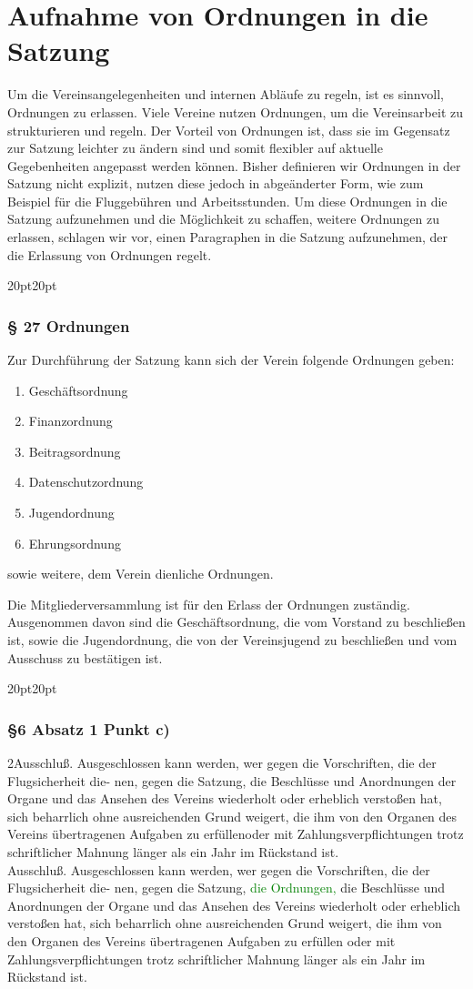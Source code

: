 \documentclass[10pt,a4paper,parskip=half]{scrartcl}
\newcommand{\new}[1]{\textcolor{Green}{#1}}
\newcommand{\change}[1]{
  \begin{adjustwidth}{20pt}{20pt}
    #1
  \end{adjustwidth}
}
\newcommand{\compare}[3]{\change{\subsubsection*{#1}\begin{multicols}{2}#2\columnbreak\\#3\end{multicols}}}
\begin{document}
  \section{Aufnahme von Ordnungen in die Satzung}
  \label{sec:ordnungen}
  Um die Vereinsangelegenheiten und internen Abläufe zu regeln, ist es sinnvoll, Ordnungen zu erlassen. Viele Vereine nutzen Ordnungen, um die Vereinsarbeit zu strukturieren und regeln. Der Vorteil von Ordnungen ist, dass sie im Gegensatz zur Satzung leichter zu ändern sind und somit flexibler auf aktuelle Gegebenheiten angepasst werden können. Bisher definieren wir Ordnungen in der Satzung nicht explizit, nutzen diese jedoch in abgeänderter Form, wie zum Beispiel für die Fluggebühren und Arbeitsstunden. Um diese Ordnungen in die Satzung aufzunehmen und die Möglichkeit zu schaffen, weitere Ordnungen zu erlassen, schlagen wir vor, einen Paragraphen in die Satzung aufzunehmen, der die Erlassung von Ordnungen regelt.

  \change{
    \subsubsection*{§ 27 Ordnungen}
    Zur Durchführung der Satzung kann sich der Verein folgende Ordnungen geben:
    \begin{enumerate}[label=\alph*),noitemsep]
      \item Geschäftsordnung
      \item Finanzordnung
      \item Beitragsordnung
      \item Datenschutzordnung
      \item Jugendordnung
      \item Ehrungsordnung
    \end{enumerate}
    sowie weitere, dem Verein dienliche Ordnungen.
    
    Die Mitgliederversammlung ist für den Erlass der Ordnungen zuständig.
    Ausgenommen davon sind die Geschäftsordnung,
    die vom Vorstand zu beschließen ist,
    sowie die Jugendordnung,
    die von der Vereinsjugend zu beschließen und vom Ausschuss zu bestätigen ist.
    
  }

  \compare{§6 Absatz 1 Punkt c)}
  {Ausschluß. Ausgeschlossen kann werden, wer gegen die Vorschriften, die der Flugsicherheit die-
nen, gegen die Satzung, die Beschlüsse und Anordnungen der Organe und das Ansehen des Vereins wiederholt oder erheblich verstoßen hat, sich beharrlich ohne ausreichenden Grund weigert, die ihm von den Organen des Vereins übertragenen Aufgaben zu erfüllenoder mit
Zahlungsverpflichtungen trotz schriftlicher Mahnung länger als ein Jahr im Rückstand ist.}
{Ausschluß. Ausgeschlossen kann werden, wer gegen die Vorschriften, die der Flugsicherheit die-
nen, gegen die Satzung, \new{die Ordnungen,} die Beschlüsse und Anordnungen der Organe und das
Ansehen des Vereins wiederholt oder erheblich verstoßen hat, sich beharrlich ohne ausreichenden
Grund weigert, die ihm von den Organen des Vereins übertragenen Aufgaben zu erfüllen oder mit
Zahlungsverpflichtungen trotz schriftlicher Mahnung länger als ein Jahr im Rückstand ist.}
\end{document}
